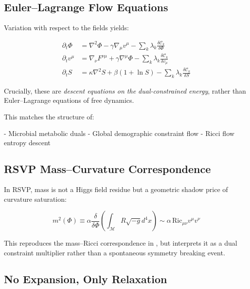 \documentclass[11pt,a4paper]{article}
\begin{document}
\subsection{Euler–Lagrange Flow Equations}

Variation with respect to the fields yields:

\begin{align}
\partial_t \Phi &= \nabla^2 \Phi - \gamma \nabla_\mu v^\mu - \sum_k \lambda_k \frac{\delta \mathcal{C}_k}{\delta \Phi} \\
\partial_t v^\mu &= \nabla_\nu F^{\nu\mu} + \gamma \nabla^\mu \Phi - \sum_k \lambda_k \frac{\delta \mathcal{C}_k}{\delta v_\mu} \\
\partial_t S &= \kappa \nabla^2 S + \beta (1 + \ln S) - \sum_k \lambda_k \frac{\delta \mathcal{C}_k}{\delta S}
\end{align}

Crucially, these are \textit{descent equations on the dual-constrained energy}, rather than Euler–Lagrange equations of free dynamics.

This matches the structure of:

- Microbial metabolic duals \citep{Yamagishi2025}
- Global demographic constraint flow \citep{Amadei2025}
- Ricci flow entropy descent \citep{Perelman2002}

\subsection{RSVP Mass–Curvature Correspondence}

In RSVP, mass is not a Higgs field residue but a geometric shadow price of curvature saturation:

\begin{equation}
m^2(\Phi) \equiv \alpha \frac{\delta}{\delta \Phi} \left( \int_{\mathcal{M}} R \sqrt{-g} d^4x \right)
\sim \alpha \, \mathrm{Ric}_{\mu\nu} v^\mu v^\nu
\end{equation}

This reproduces the mass–Ricci correspondence in \citet{Pincak2025}, but interprets it as a dual constraint multiplier rather than a spontaneous symmetry breaking event.

\subsection{No Expansion, Only Relaxation}
\end{document}
